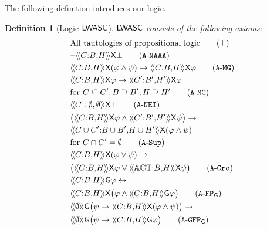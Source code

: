 \documentclass{article}
\newtheorem{definition}{Definition}
\begin{document}
The following definition introduces our logic. 
\begin{definition}[Logic $\mathsf{LWASC}$]
\label{definition: axiomatic system}
$\mathsf{LWASC}$ consists of the following axioms:
\begin{align*}
& 
\text{All tautologies of propositional logic} \tag{$\top$} \label{ax:taut} 
\\
&
\neg \atlbh{\Coalition}{\GroupB}{\GroupH}\nexttime \bot \tag{$\mathtt{A}\text{-}\mathtt{NAAA}$} \label{ax:NAAA}
\\
&
\atlbh{\Coalition}{\GroupB}{\GroupH}\nexttime (\phi\wedge \psi)\rightarrow  \atlbh{\Coalition}{\GroupB}{\GroupH}\nexttime \phi
\tag{$\mathtt{A}\text{-}\mathtt{MG}$} \label{ax:MG}
\\
& 
\atlbh{\Coalition}{\GroupB}{\GroupH}\nexttime \phi \rightarrow  \atlbh{\Coalition'}{\GroupB'}{\GroupH'}\nexttime\varphi  \\
&  \text{for }\Coalition\subseteq \Coalition', \GroupB\supseteq \GroupB', \GroupH\supseteq \GroupH'
\tag{$\mathtt{A}\text{-}\mathtt{MC}$} \label{ax:MC}\\
&\atlop{\Coalition: \emptyset,\emptyset}\nexttime \top \tag{$\mathtt{A}\text{-}\mathtt{NEI}$} \label{ax:Ser}
\\
& 
\big(\atlbh{\Coalition}{\GroupB}{\GroupH}\nexttime \phi \wedge \atlbh{\Coalition'}{\GroupB'}{\GroupH'}\nexttime \psi \big)\rightarrow  \\
& \atlbh{\Coalition\cup\Coalition'}{\GroupB\cup \GroupB'}{\GroupH\cup \GroupH'}\nexttime (\phi\wedge\psi) \\
&\text{for }\Coalition\cap \Coalition'=\emptyset
\tag{$\mathtt{A}\text{-}\mathtt{Sup}$} \label{ax:Sup}
\\
& 
\atlbh{\Coalition}{\GroupB}{\GroupH}\nexttime (\phi\vee \psi)\rightarrow \\
& \big(\atlbh{\Coalition}{\GroupB}{\GroupH}\nexttime \phi \vee \atlbh{\AGT}{\GroupB}{\GroupH}\nexttime \psi \big)
\tag{$\mathtt{A}\text{-}\mathtt{Cro}$} \label{ax:Cro}
\\
& 
\atlbh{\Coalition}{B}{H}\G \phi \iff \\
& \atlbh{\Coalition}{B}{H}\nexttime \big(\phi \wedge \atlbh{\Coalition}{B}{H}\G \phi \big)
\tag{$\mathtt{A}\text{-}\mathtt{FP}_\G$}\label{ax:FP_G}
\\
& 
\atlop{\emptyset}\G\big(\psi \rightarrow \atlbh{\Coalition}{B}{H}\X(\phi \wedge \psi)\big ) \rightarrow \\
& \atlop{\emptyset }\G \big(\psi \rightarrow \atlbh{\Coalition}{B}{H}\G \phi \big)
\tag{$\mathtt{A}\text{-}\mathtt{GFP}_\G$}\label{ax:GFP_G}

\end{align*}
\end{definition}
\end{document}
